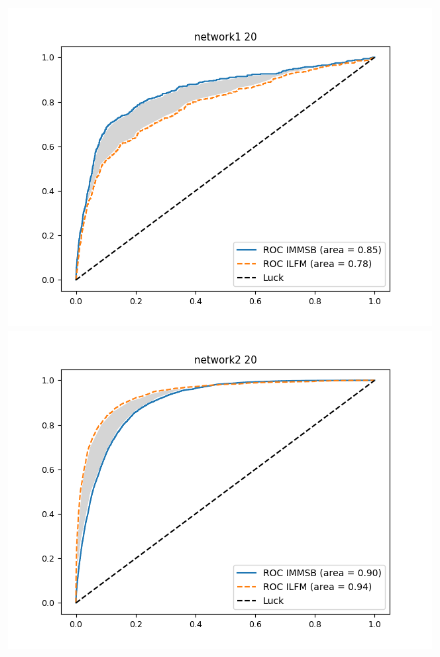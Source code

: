\begin{figure}[h]
    \centering
        \begin{minipage}{0.24\textwidth}
            \includegraphics[width=\textwidth]{img/corpus/roc_network1_20_f}
        \end{minipage}
        \begin{minipage}{0.24\textwidth}
            \includegraphics[width=\textwidth]{img/corpus/roc_network2_20_f}
        \end{minipage}
        \begin{minipage}{0.4\textwidth}

\end{minipage}
\end{figure}
